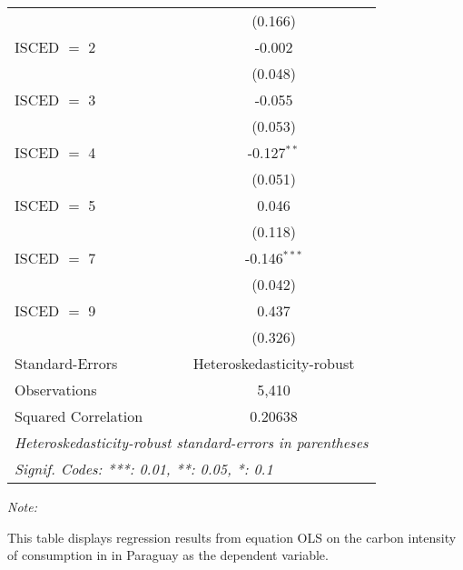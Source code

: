 \begin{table}[htbp!]
\begin{adjustbox}{width = 1\textwidth, max height = 0.95\textheight, center}
\begin{threeparttable}[b]
\begin{tabular}{lc}
                                & (0.166)\\   
            ISCED $=$ 2         & -0.002\\   
                                & (0.048)\\   
            ISCED $=$ 3         & -0.055\\   
                                & (0.053)\\   
            ISCED $=$ 4         & -0.127$^{**}$\\   
                                & (0.051)\\   
            ISCED $=$ 5         & 0.046\\   
                                & (0.118)\\   
            ISCED $=$ 7         & -0.146$^{***}$\\   
                                & (0.042)\\   
            ISCED $=$ 9         & 0.437\\   
                                & (0.326)\\   
            \midrule 
            Standard-Errors     & Heteroskedasticity-robust \\   
            Observations        & 5,410\\  
            Squared Correlation & 0.20638\\  
            \midrule \midrule
            \multicolumn{2}{l}{\emph{Heteroskedasticity-robust standard-errors in parentheses}}\\
            \multicolumn{2}{l}{\emph{Signif. Codes: ***: 0.01, **: 0.05, *: 0.1}}\\
         \end{tabular}
         
         \begin{tablenotes}\item \medskip \textit{Note:}
            \item This table displays regression results from equation OLS on the carbon intensity of consumption in  in Paraguay as the dependent variable. 
         \end{tablenotes}
      \end{threeparttable}
   \end{adjustbox}
\end{table}


